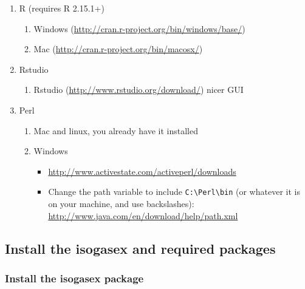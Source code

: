 \documentclass[]{article}
\providecommand{\tightlist}{%
  \setlength{\itemsep}{0pt}\setlength{\parskip}{0pt}}
\begin{document}
\begin{enumerate}
\def\labelenumi{\arabic{enumi}.}
\item
  R (requires R 2.15.1+)

  \begin{enumerate}
  \def\labelenumii{\arabic{enumii}.}
  \tightlist
  \item
    Windows (\url{http://cran.r-project.org/bin/windows/base/})
  \item
    Mac (\url{http://cran.r-project.org/bin/macosx/})
  \end{enumerate}
\item
  Rstudio

  \begin{enumerate}
  \def\labelenumii{\arabic{enumii}.}
  \tightlist
  \item
    Rstudio (\url{http://www.rstudio.org/download/}) nicer GUI
  \end{enumerate}
\item
  Perl

  \begin{enumerate}
  \def\labelenumii{\arabic{enumii}.}
  \item
    Mac and linux, you already have it installed
  \item
    Windows

    \begin{itemize}
    \tightlist
    \item
      \url{http://www.activestate.com/activeperl/downloads}
    \item
      Change the path variable to include
      \texttt{C:\textbackslash{}Perl\textbackslash{}bin} (or whatever it
      is on your machine, and use backslashes):
      \url{http://www.java.com/en/download/help/path.xml}
    \end{itemize}
  \end{enumerate}
\end{enumerate}

\hypertarget{install-the-isogasex-and-required-packages}{%
\subsection{Install the isogasex and required
packages}\label{install-the-isogasex-and-required-packages}}

\hypertarget{install-the-isogasex-package}{%
\subsubsection{Install the isogasex
package}\label{install-the-isogasex-package}}
\end{document}
